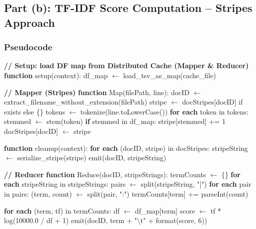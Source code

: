 \documentclass[12pt,a4paper]{article}
\begin{document}
\clearpage
\subsection{Part (b): TF-IDF Score Computation -- Stripes Approach}
\subsubsection{Pseudocode}

\begin{algorithm}
\caption{TF-IDF Score --- Stripes MapReduce}
\begin{algorithmic}[1]

\State \textbf{// Setup: load DF map from Distributed Cache (Mapper \& Reducer)}
\State \textbf{function} setup(context):
\State \quad df\_map $\gets$ load\_tsv\_as\_map(cache\_file) 

\vspace{0.5em}
\State \textbf{// Mapper (Stripes)}
\State \textbf{function} Map(filePath, line):
\State \quad docID $\gets$ extract\_filename\_without\_extension(filePath)
\State \quad stripe $\gets$ docStripes[docID] if exists else \{\}
\State \quad tokens $\gets$ tokenize(line.toLowerCase())
\State \quad \textbf{for each} token in tokens:
\State \qquad stemmed $\gets$ stem(token)
\State \qquad \textbf{if} stemmed in df\_map:
\State \qquad\quad stripe[stemmed] += 1
\State \quad docStripes[docID] $\gets$ stripe

\State \textbf{function} cleanup(context):
\State \quad \textbf{for each} (docID, stripe) in docStripes:
\State \qquad stripeString $\gets$ serialize\_stripe(stripe) 
\State \qquad emit(docID, stripeString)

\vspace{0.5em}
\State \textbf{// Reducer}
\State \textbf{function} Reduce(docID, stripeStrings):
\State \quad termCounts $\gets$ \{\}
\State \quad \textbf{for each} stripeString in stripeStrings:
\State \qquad pairs $\gets$ split(stripeString, "|")
\State \qquad \textbf{for each} pair in pairs:
\State \qquad\quad (term, count) $\gets$ split(pair, ":")
\State \qquad\quad termCounts[term] += parseInt(count)

\State \quad \textbf{for each} (term, tf) in termCounts:
\State \qquad df $\gets$ df\_map[term]
\State \qquad score $\gets$ tf * log(10000.0 / df + 1)
\State \qquad emit(docID, term + "\textbackslash t" + format(score, 6))

\end{algorithmic}
\end{algorithm}
\end{document}
